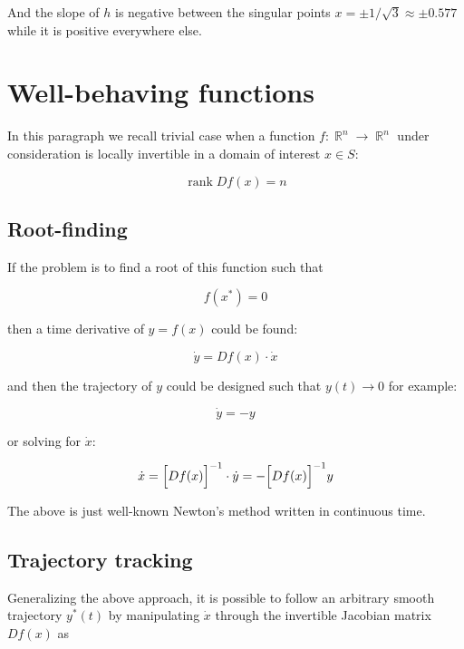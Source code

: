 \documentclass[11pt,american]{article}
\DeclareMathOperator{\R}{\mathbb{R}}
\DeclareMathOperator{\rank}{\operatorname{rank}}
\begin{document}
And the slope of $h$ is negative between the singular points $x = \pm 1/\sqrt{3} \approx \pm 0.577$ while it is positive everywhere else.

\section{Well-behaving functions}

In this paragraph we recall trivial case when a function $f: \R^n \to \R^n$ under consideration is locally invertible in a domain of interest $x \in S$:

\begin{equation}
\rank D f(x) = n
\end{equation}

\subsection{Root-finding}

If the problem is to find a root of this function such that

\begin{equation}
f(x^*) = 0
\end{equation}

then a time derivative of $y = f(x)$ could be found:

\begin{equation}
\dot y = D f(x) \cdot \dot x
\end{equation}

and then the trajectory of $y$ could be designed such that $y(t) \to 0$ for example:

\begin{equation}
\dot y = -y
\end{equation}

or solving for $\dot x$:

\begin{equation}
\dot x = \Bigl[ D f(x) \Bigr]^{-1} \cdot \dot y = -\Bigl[ D f(x) \Bigr]^{-1} y
\end{equation}

The above is just well-known Newton's method written in continuous time.

\subsection{Trajectory tracking}

Generalizing the above approach, it is possible to follow an arbitrary smooth trajectory $y^*(t)$ by manipulating $\dot x$ through the invertible Jacobian matrix $D f(x)$ as 
\end{document}
